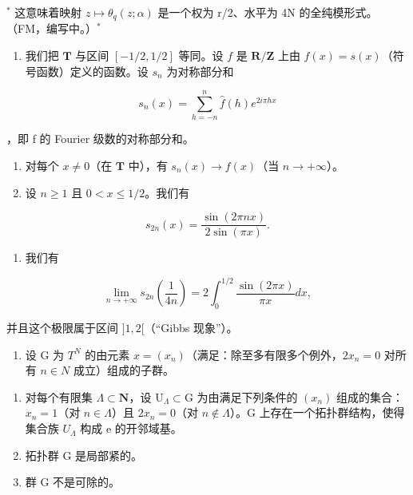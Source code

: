 \(^{*}\) 这意味着映射 \(z \mapsto \theta_{q}(z; \alpha)\) 是一个权为 r/2、水平为 4N 的全纯模形式。（FM，编写中。）\(^{*}\)

\begin{enumerate}
\def\labelenumi{\arabic{enumi})}
\setcounter{enumi}{61}
\tightlist
\item
  我们把 \(\mathbf{T}\) 与区间 \([-1/2, 1/2]\) 等同。设 \(f\) 是 \(\mathbf{R}/\mathbf{Z}\) 上由 \(f(x) = s(x)\)（符号函数）定义的函数。设 \(s_n\) 为对称部分和
\end{enumerate}

\[
s _ {n} (x) = \sum_ {h = - n} ^ {n} \widehat {f} (h) e ^ {2 i \pi h x}
\]

，即 f 的 Fourier 级数的对称部分和。

\begin{enumerate}
\def\labelenumi{\alph{enumi})}
\item
  对每个 \(x \neq 0\)（在 \(\mathbf{T}\) 中），有 \(s_n(x) \to f(x)\)（当 \(n \to +\infty\)）。
\item
  设 \(n \geqslant 1\) 且 \(0 < x \leqslant 1/2\)。我们有
\end{enumerate}

\[
s _ {2 n} (x) = \frac {\sin (2 \pi n x)}{2 \sin (\pi x)}.
\]

\begin{enumerate}
\def\labelenumi{\alph{enumi})}
\setcounter{enumi}{2}
\tightlist
\item
  我们有
\end{enumerate}

\[
\lim _ {n \rightarrow + \infty} s _ {2 n} \left(\frac {1}{4 n}\right) = 2 \int_ {0} ^ {1 / 2} \frac {\sin (2 \pi x)}{\pi x} d x,
\]

并且这个极限属于区间 \(]1,2[\)（“Gibbs 现象”）。

\begin{enumerate}
\def\labelenumi{\arabic{enumi})}
\setcounter{enumi}{62}
\tightlist
\item
  设 G 为 \(T^{N}\) 的由元素 \(x = (x_{n})\)（满足：除至多有限多个例外，\(2x_{n} = 0\) 对所有 \(n \in N\) 成立）组成的子群。
\end{enumerate}

\begin{enumerate}
\def\labelenumi{\alph{enumi})}
\item
  对每个有限集 \(\Lambda \subset \mathbf{N}\)，设 \(\mathrm{U}_{\Lambda} \subset \mathrm{G}\) 为由满足下列条件的 \((x_{n})\) 组成的集合：\(x_{n} = 1\)（对 \(n \in \Lambda\)）且 \(2x_{n} = 0\)（对 \(n \notin \Lambda\)）。G 上存在一个拓扑群结构，使得集合族 \(U_{\Lambda}\) 构成 e 的开邻域基。
\item
  拓扑群 G 是局部紧的。
\item
  群 G 不是可除的。
\end{enumerate}

